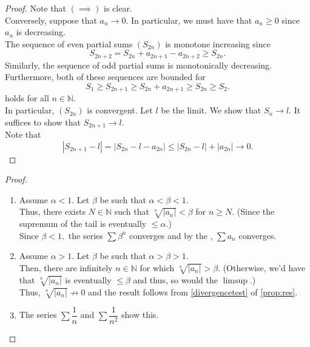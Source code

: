 \altseries*\label{thm:altseries2}
\begin{flushright}\hyperref[thm:altseries]{\upsym}\end{flushright}
\begin{proof}
	Note that $(\implies)$ is clear.\\
	Conversely, suppose that $a_n \to 0.$ In particular, we must have that $a_n \ge 0$ since $a_n$ is decreasing. \\
	The sequence of even partial sums $(S_{2n})$ is monotone increasing since
	\begin{equation*} 
		S_{2n+2} = S_{2n} + a_{2n+1} - a_{2n+2} \ge S_{2n}.
	\end{equation*}
	Similarly, the sequence of odd partial sums is monotonically decreasing. Furthermore, both of these sequences are bounded for
	\begin{equation*} 
		S_1 \ge S_{2n+1} \ge S_{2n} + a_{2n+1} \ge S_{2n} \ge S_2.
	\end{equation*}
	holds for all $n \in \mathbb{N}.$ \\
	In particular, $(S_{2n})$ is convergent. Let $l$ be the limit. We show that $S_n \to l.$ It suffices to show that $S_{2n+1} \to l.$\\
	Note that 
	\begin{equation*} 
		|S_{2n+1} - l| = |S_{2n} - l - a_{2n}| \le |S_{2n} - l| + |a_{2n}| \to 0.
	\end{equation*}
\end{proof}

\roottest*\label{thm:roottest2}
\begin{flushright}\hyperref[thm:roottest]{\upsym}\end{flushright}
\begin{proof}
	\begin{enumerate}[label = (\roman*)]
		\item Assume $\alpha < 1.$ Let $\beta$ be such that $\alpha < \beta < 1.$\\
		Thus, there exists $N \in \mathbb{N}$ such that $\sqrt[n]{|a_n|} < \beta$ for $n \ge N.$ (Since the supremum of the tail is eventually $\le \alpha.$)\\
		Since $\beta < 1,$ the series $\sum \beta^n$ converges and by the , $\sum a_n$ converges.
		
		\item Assume $\alpha > 1.$ Let $\beta$ be such that $\alpha > \beta > 1.$\\
		Then, there are infinitely $n \in \mathbb{N}$ for which $\sqrt[n]{|a_n|} > \beta.$ (Otherwise, we'd have that $\sqrt[n]{|a_n|}$ is eventually $\le \beta$ and thus, so would the $\limsup$.)\\
		Thus, $\sqrt[n]{|a_n|} \not\to 0$ and the result follows from \cref{divergencetest} of \cref{prop:res}.
		
		\item The series $\sum \dfrac{1}{n}$ and $\sum \dfrac{1}{n^2}$ show this.
	\end{enumerate}
\end{proof}

